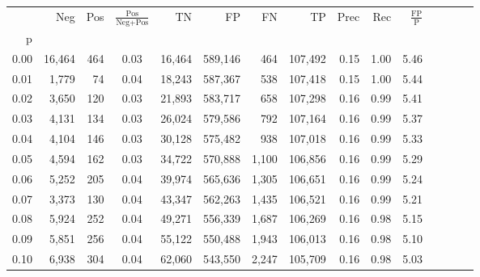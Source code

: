 \begin{tabular}{rrrcrrrrrrrrrrr}
\toprule
{} &     Neg &    Pos & $\frac{\text{Pos}}{\text{Neg}+\text{Pos}}$ &       TN &       FP &       FN &       TP &  Prec &   Rec & $\frac{\text{FP}}{\text{P}}$ \\
p    &         &        &                                            &          &          &          &          &       &       &                              \\
\midrule
0.00 &  16,464 &    464 &                                       0.03 &   16,464 &  589,146 &      464 &  107,492 &  0.15 &  1.00 &                         5.46 \\
0.01 &   1,779 &     74 &                                       0.04 &   18,243 &  587,367 &      538 &  107,418 &  0.15 &  1.00 &                         5.44 \\
0.02 &   3,650 &    120 &                                       0.03 &   21,893 &  583,717 &      658 &  107,298 &  0.16 &  0.99 &                         5.41 \\
0.03 &   4,131 &    134 &                                       0.03 &   26,024 &  579,586 &      792 &  107,164 &  0.16 &  0.99 &                         5.37 \\
0.04 &   4,104 &    146 &                                       0.03 &   30,128 &  575,482 &      938 &  107,018 &  0.16 &  0.99 &                         5.33 \\
0.05 &   4,594 &    162 &                                       0.03 &   34,722 &  570,888 &    1,100 &  106,856 &  0.16 &  0.99 &                         5.29 \\
0.06 &   5,252 &    205 &                                       0.04 &   39,974 &  565,636 &    1,305 &  106,651 &  0.16 &  0.99 &                         5.24 \\
0.07 &   3,373 &    130 &                                       0.04 &   43,347 &  562,263 &    1,435 &  106,521 &  0.16 &  0.99 &                         5.21 \\
0.08 &   5,924 &    252 &                                       0.04 &   49,271 &  556,339 &    1,687 &  106,269 &  0.16 &  0.98 &                         5.15 \\
0.09 &   5,851 &    256 &                                       0.04 &   55,122 &  550,488 &    1,943 &  106,013 &  0.16 &  0.98 &                         5.10 \\
0.10 &   6,938 &    304 &                                       0.04 &   62,060 &  543,550 &    2,247 &  105,709 &  0.16 &  0.98 &                         5.03 \\

\end{tabular}

